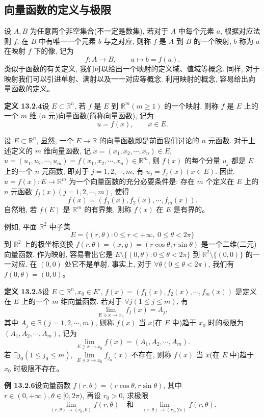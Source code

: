 \documentclass[UTF8, 12pt, fontset=fandol, oneside]{ctexart}
\begin{document}
\subsection{向量函数的定义与极限}

设 $A,B$ 为任意两个非空集合(不一定是数集), 若对于 $A$ 中每个元素 $a$, 根据对应法则 $f$, 在 $B$ 中有唯一一个元素 $b$ 与之对应, 则称 $f$ 是 $A$ 到 $B$ 的一个映射, $b$ 称为 $a$ 在映射 $f$ 下的像, 记为
\[
  f:A\to B,\qquad a\mapsto b=f(a).
\]
类似于函数的有关定义, 我们可以给出一个映射的定义域、值域等概念. 同样, 对于映射我们可以引进单射、满射以及一一对应等概念. 利用映射的概念, 容易给出向量函数的定义。

\noindent\textbf{定义 13.2.4}\quad 设 $E\subset\mathbb R^n$, 若 $f$ 是 $E$ 到 $\mathbb R^m(m\ge1)$ 的一个映射, 则称 $f$ 是 $E$ 上的一个 $m$ 维 $(n$ 元)向量函数(简称向量函数), 记为
\[
  u=f(x),\qquad x\in E.
\]

设 $E\subset\mathbb R^n$, 显然, 一个 $E\to\mathbb R$ 的向量函数即是前面我们讨论的 $n$ 元函数. 对于上述定义的 $m$ 维向量函数, 记 $x=(x_1,x_2,\cdots,x_n)\in E$, $u=(u_1,u_2,\cdots,u_m)=f(x_1,x_2,\cdots,x_n)\in\mathbb R^m$, 则 $f(x)$ 的每个分量 $u_j$ 都是 $E$ 上的一个 $n$ 元函数, 即对于 $j=1,2,\cdots,m$, 有 $u_j=f_j(x)(x\in E)$. 因此 $u=f(x):E\to\mathbb R^m$ 为一个向量函数的充分必要条件是: 存在 $m$ 个定义在 $E$ 上的 $n$ 元函数 $f_j(x)(j=1,2,\cdots,m)$, 使得
\[
  f(x)=(f_1(x),f_2(x),\cdots,f_m(x)).
\]
自然地, 若 $f(E)$ 是 $\mathbb R^m$ 的有界集, 则称 $f(x)$ 在 $E$ 是有界的。

例如, 平面 $\mathbb R^2$ 中子集
\[
  E=\{(r,\theta):0\le r<+\infty,\ 0\le\theta<2\pi\}
\]
到 $\mathbb R^2$ 上的极坐标变换 $f(r,\theta)=(x,y)=(r\cos\theta,r\sin\theta)$ 是一个二维(二元)向量函数. 作为映射, 容易看出它是 $E\setminus\{(0,\theta):0\le\theta<2\pi\}$ 到 $\mathbb R^2\setminus\{(0,0)\}$ 的一一对应. 在 $(0,0)$ 处它不是单射. 事实上, 对于 $\forall\theta(0\le\theta<2\pi)$, 我们有 $f(0,\theta)=(0,0)$。

\noindent\textbf{定义 13.2.5}\quad 设 $E\subset\mathbb R^n,x_0\in E'$, $f(x)=(f_1(x),f_2(x),\cdots,f_m(x))$ 是定义在 $E$ 上的一个 $m$ 维向量函数. 若对于 $\forall j(1\le j\le m)$, 有
\[
  \lim_{E\ni x\to x_0}f_j(x)=A_j,
\]
其中 $A_j\in\mathbb R(j=1,2,\cdots,m)$, 则称 $f(x)$ 当 $x$(在 $E$ 中)趋于 $x_0$ 时的极限为 $(A_1,A_2,\cdots,A_m)$, 记为
\[
  \lim_{E\ni x\to x_0}f(x)=(A_1,A_2,\cdots,A_m).
\]
若 $\exists j_0(1\le j_0\le m)$, $\lim\limits_{E\ni x\to x_0}f_{j_0}(x)$ 不存在, 则称 $f(x)$ 当 $x$(在 $E$ 中)趋于 $x_0$ 时极限不存在。

\noindent\textbf{例 13.2.6}\quad 设向量函数 $f(r,\theta)=(r\cos\theta,r\sin\theta)$, 其中 $r\in(0,+\infty),\theta\in[0,2\pi)$, 再设 $r_0>0$, 求极限
\[
  \lim_{(r,\theta)\to(r_0,0)}f(r,\theta)
  \quad\text{和}\quad
  \lim_{(r,\theta)\to(r_0,2\pi)}f(r,\theta).
\]
\end{document}
